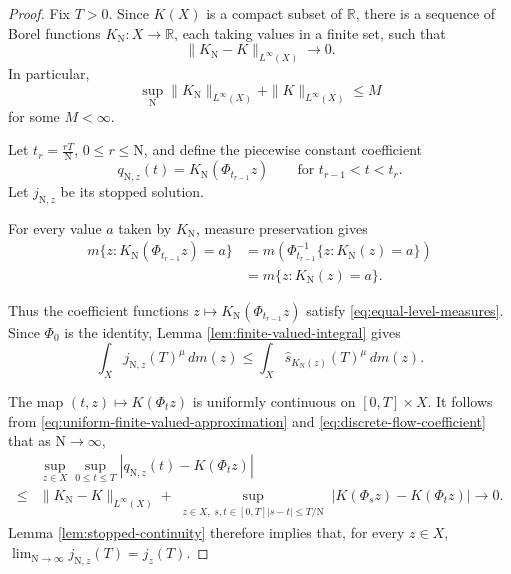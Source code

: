 \documentclass[11pt, reqno]{amsart}
\begin{document}
\begin{proof}
Fix $T>0$. Since $K(X)$ is a compact subset of $\mathbb R$, there is a sequence of Borel functions $K_{\mathrm{N}}\colon X\to\mathbb R$, each taking values in a finite set, such that
\begin{equation}\label{eq:uniform-finite-valued-approximation}
\|K_{\mathrm{N}}-K\|_{L^\infty(X)}\longrightarrow0.
\end{equation}
In particular,
\begin{equation}\label{eq:uniform-coefficient-bound}
\sup_{\mathrm{N}}\|K_{\mathrm{N}}\|_{L^\infty(X)}+\|K\|_{L^\infty(X)}\le M
\end{equation}
for some $M<\infty$.

Let $t_r=\frac{rT}{{\mathrm{N}}}$, \;$0\le r\le {\mathrm{N}}$,
and define the piecewise constant coefficient
\begin{equation}\label{eq:discrete-flow-coefficient}
q_{{\mathrm{N}}, z}(t)=K_{\mathrm{N}}(\Phi_{t_{r-1}}z)
\qquad
\text{for }t_{r-1}<t<t_r.
\end{equation}
Let $j_{{\mathrm{N}}, z}$ be its stopped solution.

For every value $a$ taken by $K_{\mathrm{N}}$, measure preservation gives
\begin{align*}
m\{z:K_{\mathrm{N}}(\Phi_{t_{r-1}}z)=a\}
& =
m\left(\Phi_{t_{r-1}}^{-1}\{z:K_{\mathrm{N}}(z)=a\}\right)\\
& =
m\{z:K_{\mathrm{N}}(z)=a\}.
\end{align*}

Thus the coefficient functions $z\longmapsto K_{\mathrm{N}}(\Phi_{t_{r-1}}z)$ satisfy \eqref{eq:equal-level-measures}. Since $\Phi_0$ is the identity, Lemma \ref{lem:finite-valued-integral} gives
\begin{equation}\label{eq:approximating-integral-comparison}
\int_Xj_{{\mathrm{N}}, z}(T)^\mu\, dm(z)
\le \int_X\widehat s_{K_{\mathrm{N}}(z)}(T)^\mu\, dm(z).
\end{equation}

The map $(t, z)\longmapsto K(\Phi_tz)$ is uniformly continuous on $[0, T]\times X$. It follows
from \eqref{eq:uniform-finite-valued-approximation} and
\eqref{eq:discrete-flow-coefficient} that as $\mathrm{N}\to\infty$,
\begin{align*}
& \sup_{z\in X}\sup_{0\le t\le T} \left|q_{{\mathrm{N}}, z}(t)-K(\Phi_tz)\right|\\
\le& \lVert K_{\mathrm{N}}-K\rVert_{L^\infty(X)} + \sup_{\substack{z\in X, \;s, t\in[0, T] |s-t|\le T/{\mathrm{N}}}} \left|K(\Phi_sz)-K(\Phi_tz)\right| \longrightarrow0.
\end{align*}
Lemma \ref{lem:stopped-continuity} therefore implies that, for every $z\in X$, $\displaystyle \lim_{\mathrm{N}\to \infty}j_{{\mathrm{N}}, z}(T)= j_z(T)$.


\end{proof}
\end{document}
